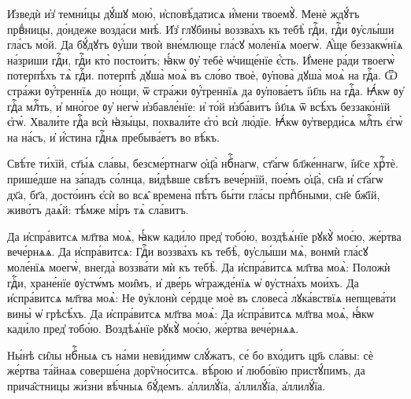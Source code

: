 \hKv И҆зведѝ и҆з̾ темни́цы дꙋ́шꙋ мою̀,  и҆сповѣ́датисѧ и҆́мени твоемꙋ̀. 
\hKv Менѐ ждꙋ́тъ  првⷣницы, до́ндеже возда́си мнѣ̀. 
%
\hKv И҆з̾ глꙋбины̀ воззва́хъ къ тебѣ̀ гдⷭ҇и,  гдⷭ҇и ᲂу҆слы́ши гла́съ мо́й. 
\hKv Да бꙋ́дꙋтъ ᲂу҆́ши твоѝ  вне́млюще гла́сꙋ моле́нїѧ моегѡ̀. 
%
\hKv А҆́ще беззакѡ́нїѧ на́зриши гдⷭ҇и, гдⷭ҇и кто̀  постои́тъ; ꙗ҆́кѡ ᲂу҆ тебѐ ѡ҆чище́нїе є҆́сть. 
\hKv И҆́мене ра́ди твоегѡ̀ потерпѣ́хъ тѧ̀ гдⷭ҇и.  потерпѣ̀ дꙋша̀ моѧ̀ въ сло́во твоѐ,  ᲂу҆пова̀ дꙋша̀ моѧ̀ на гдⷭ҇а. 
%
\hKv Ѿ стра́жи ᲂу҆́треннїѧ до но́щи, ѿ  стра́жи ᲂу҆́треннїѧ да ᲂу҆пова́етъ і҆и҃ль на гдⷭ҇а. 
\hKv Ꙗ҆́кѡ ᲂу҆ гдⷭ҇а млⷭ҇ть, и҆ мно́гое ᲂу҆ негѡ̀  и҆збавле́нїе: и҆ то́й и҆зба́витъ і҆и҃лѧ ѿ всѣ́хъ  беззако́нїй є҆гѡ̀. 
\hKv Хвали́те гдⷭ҇а всѝ ꙗ҆зы́цы, похвали́те є҆го̀ всѝ лю́дїе. 
\hKv Ꙗ҆́кѡ ᲂу҆тверди́сѧ  млⷭ҇ть є҆гѡ̀ на на́съ, и҆ и҆́стина гдⷭ҇нѧ пребыва́етъ во  вѣ́къ. 


\hKv Свѣ́те ти́хїй, ст҃ы́ѧ сла́вы, безсме́ртнагѡ ѻ҆ц҃а̀  нбⷭ҇нагѡ, ст҃а́гѡ бл҃же́ннагѡ, і҆и҃се хрⷭ҇тѐ. прише́дше на  за́падъ со́лнца, ви́дѣвше свѣ́тъ вече́рнїй, пое́мъ  ѻ҆ц҃а̀, сн҃а и҆ ст҃а́гѡ дх҃а, бг҃а, досто́инъ є҆сѝ во  всѧ̑ времена̀ пѣ́тъ бы́ти гла́сы прпⷣбными, сн҃е бж҃їй,  живо́тъ даѧ́й: тѣ́мже мі́ръ тѧ̀ сла́витъ. 

Да и҆спра́витсѧ  мл҃тва моѧ̀, ꙗ҆́кѡ кади́ло пред̾ тобо́ю, воздѣѧ́нїе рꙋкꙋ̀  моє́ю, же́ртва вече́рнѧѧ. 
%
 \hKv Да и҆спра́витсѧ:  
%
 Гдⷭ҇и воззва́хъ къ тебѣ̀, ᲂу҆слы́ши  мѧ̀, вонмѝ гла́сꙋ моле́нїѧ моегѡ̀, внегда̀ воззва́ти мѝ къ  тебѣ̀. 
%
 \hKv Да и҆спра́витсѧ мл҃тва моѧ̀:  
%
 \hKv Положѝ гдⷭ҇и, хране́нїе ᲂу҆стѡ́мъ  мои̑мъ, и҆ две́рь ѡ҆гражде́нїѧ ѡ҆ ᲂу҆стна́хъ мои́хъ.
%
 Да и҆спра́витсѧ мл҃тва моѧ̀:  
%
 \hKv Не ᲂу҆клонѝ се́рдце моѐ въ словеса̀  лꙋка́вствїѧ непщева́ти вины̀ ѡ҆ грѣсѣ́хъ. 
%
 Да и҆спра́витсѧ мл҃тва моѧ̀:  
%
 Да и҆спра́витсѧ мл҃тва моѧ̀, ꙗ҆́кѡ  кади́ло пред̾ тобо́ю. 
%
 \hKv Воздѣѧ́нїе рꙋкꙋ̀ моє́ю, же́ртва вече́рнѧѧ.  


\hKv Ны́нѣ си̑лы нбⷭ҇ныѧ съ на́ми неви́димѡ слꙋ́жатъ, се́ бо  вхо́дитъ цр҃ь сла́вы: сѐ же́ртва та́йнаѧ соверше́на  дорѷно́ситсѧ. вѣ́рою и҆ любо́вїю пристꙋ́пимъ, да  прича̑стницы жи́зни вѣ́чныѧ бꙋ́демъ. а҆ллилꙋ́їа,  а҆ллилꙋ́їа, а҆ллилꙋ́їа. 
%

